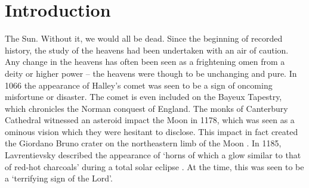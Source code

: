\chapter{Introduction}
\label{Chap:Intro}

The Sun. Without it, we would all be dead. Since the beginning of recorded history, the study of the heavens had been undertaken with an air of caution. Any change in the heavens has often been seen as a frightening omen from a deity or higher power -- the heavens were though to be unchanging and pure. In 1066 the appearance of Halley's comet was seen to be a sign of oncoming misfortune or disaster. The comet is even included on the Bayeux Tapestry, which chronicles the Norman conquest of England. The monks of Canterbury Cathedral witnessed an asteroid impact the Moon in 1178, which was seen as a ominous vision which they were hesitant to disclose. This impact in fact created the Giordano Bruno crater on the northeastern limb of the Moon \citep{sagan_cosmos_1980}. In 1185, Lavrentievsky described the appearance of `horns of which a glow similar to that of red-hot charcoals' during a total solar eclipse \citep{vyssotsky_astronomical_1949}. At the time, this was seen to be a `terrifying sign of the Lord'.

